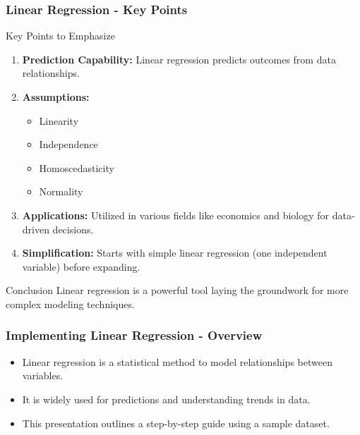\documentclass[aspectratio=169]{beamer}
\begin{document}
\begin{frame}[fragile]
    \frametitle{Linear Regression - Key Points}
    \begin{block}{Key Points to Emphasize}
        \begin{enumerate}
            \item \textbf{Prediction Capability:} Linear regression predicts outcomes from data relationships.
            \item \textbf{Assumptions:}
            \begin{itemize}
                \item Linearity
                \item Independence
                \item Homoscedasticity
                \item Normality
            \end{itemize}
            \item \textbf{Applications:} Utilized in various fields like economics and biology for data-driven decisions.
            \item \textbf{Simplification:} Starts with simple linear regression (one independent variable) before expanding.
        \end{enumerate}
    \end{block}
    
    \begin{block}{Conclusion}
        Linear regression is a powerful tool laying the groundwork for more complex modeling techniques. 
    \end{block}
\end{frame}

\begin{frame}
    \frametitle{Implementing Linear Regression - Overview}
    \begin{itemize}
        \item Linear regression is a statistical method to model relationships between variables.
        \item It is widely used for predictions and understanding trends in data.
        \item This presentation outlines a step-by-step guide using a sample dataset.
    \end{itemize}
\end{frame}
\end{document}
